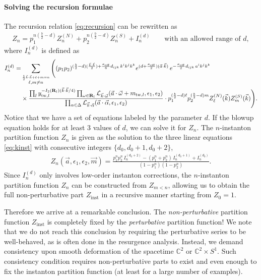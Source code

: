 \documentclass[letterpaper, 11pt]{article}
\newcommand{\nn}{\nonumber}
\def\IC{\mathbb{C}}
\def\CL{{\cal L}}
\def\a{\alpha}
\def\e{\epsilon}
\def\k{\kappa}
\def\w{\omega}
\def\D{\Delta}
\begin{document}
\paragraph{Solving the recursion formulae}
The recursion relation \eqref{eq:recursion} can be rewritten as 
\begin{align}
  \label{eq:kinst}
  Z_n = p_1^{n(\frac{b}{2}-d)}Z^{(N)}_{n}  + p_2^{n(\frac{b}{2}-d)}  Z^{(S)}_n  + I_n^{(d)} \qquad \text{with an allowed range of $d$},
\end{align}
where $I_{n}^{(d)}$ is defined as
\begin{align} \label{eq:Ind}
  I_{n}^{(d)} = &\sum_{\stackrel{\frac{1}{2}\vec{k}\cdot\vec{k} + \ell + m = n}{\ell, m \neq n}}  
  \Bigg( (p_1p_2)^{(\frac{b}{2} -d) (\frac{\vec{k}\cdot\vec{k}}{2}) +\frac{\k_\text{eff}}{6}d_{ijk}\,k^ik^jk^k} e^{(d+\frac{\k_\text{eff}}{2})(\vec{a}\cdot\vec{k})}\,
 e^{-\frac{\k_\text{eff}}{2}d_{ijk}\,a^ik^jk^k}  \\& 
 \times    \frac{\prod_{l} y_{\text{tw}, l}^{-I_2(\mathbf{R}_l)(\vec{k}\cdot\vec{k}/4)} \prod_{\w \in \mathbf{R}_l} \CL_{\vec{k}\cdot\vec{\w}}(\vec{a}\cdot \vec{\w} + m_{\text{tw},l}, \e_1,\e_2)}{ \prod_{\a \in \D} \CL_{\vec{k} \cdot \vec{\a}} (\vec{a}\cdot\vec{\alpha}, \epsilon_1, \epsilon_2)}
 \cdot p_1^{(\frac{b}{2}-d)\ell}p_2^{(\frac{b}{2}-d)m} Z^{(N)}_{\ell}(\vec{k})  Z^{(S)}_m (\vec{k}) \Bigg) . \nn
\end{align}
Notice that we have a set of equations labeled by the parameter $d$. If the blowup equation holds for at least 3 values of $d$, we can solve it for $Z_n$. 
The $n$-instanton partition function $Z_n$ is given as the solution to the three linear equations \eqref{eq:kinst} with consecutive integers $\{d_0, d_0+1, d_0+2\}$,
\begin{align}
  Z_n(\vec{a},\e_1,\e_2, \vec{m})=\frac{p_1^n p_2^n \,I_{n}^{(d_0+2)}-(p_1^n+p_2^n)\,I_{n}^{(d_0+1)}+I_{n}^{(d_0)}}{(1-p_1^n)(1-p_2^n)}.
\end{align}
Since $I_n^{(d)}$ only involves low-order instanton corrections, the $n$-instanton partition function $Z_n$ can be constructed from $Z_{m<n}$, allowing us to obtain the full non-perturbative part $Z_\text{inst}$ in a recursive manner starting from $Z_0 = 1$. 

Therefore we arrive at a remarkable conclusion. The \emph{non-perturbative} partition function $Z_\text{inst}$ is completely fixed by the \emph{perturbative} partition function! We note that we do not reach this conclusion by requiring the perturbative series to be well-behaved, as is often done in the resurgence analysis. Instead, we demand consistency upon smooth deformation of the spacetime $\IC^2$ or $\IC^2 \times S^1$. Such consistency condition requires non-perturbative parts to exist and even enough to fix the instanton partition function (at least for a large number of examples). 
\end{document}
